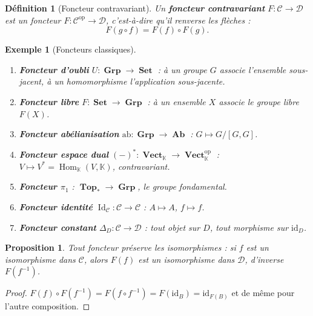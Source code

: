 \documentclass[a4paper,12pt]{book}
\DeclareMathOperator{\Hom}{Hom}
\DeclareMathOperator{\Id}{Id}
\DeclareMathOperator{\Set}{\mathbf{Set}}
\DeclareMathOperator{\Grp}{\mathbf{Grp}}
\DeclareMathOperator{\Ab}{\mathbf{Ab}}
\DeclareMathOperator{\Top}{\mathbf{Top}}
\DeclareMathOperator{\Vect}{\mathbf{Vect}}
\newcommand{\op}{\mathrm{op}}
\newcommand{\id}{\mathrm{id}}
\newcommand{\K}{\mathbb{K}}
\newtheorem{proposition}[theoreme]{Proposition}
\newtheorem{definition}[theoreme]{Définition}
\newtheorem{exemple}[theoreme]{Exemple}
\begin{document}
\begin{definition}[Foncteur contravariant]\label{def:foncteur-contra}
Un \textbf{foncteur contravariant} $F : \mathcal{C} \to \mathcal{D}$ est un foncteur $F : \mathcal{C}^{\op} \to \mathcal{D}$, c'est-à-dire qu'il \emph{renverse les flèches} :
\[
  F(g \circ f) = F(f) \circ F(g).
\]
\end{definition}

\begin{exemple}[Foncteurs classiques]\label{ex:foncteurs}
\begin{enumerate}[label=(\alph*)]
  \item \textbf{Foncteur d'oubli} $U : \Grp \to \Set$ : à un groupe $G$ associe l'ensemble sous-jacent, à un homomorphisme l'application sous-jacente.
  \item \textbf{Foncteur libre} $F : \Set \to \Grp$ : à un ensemble $X$ associe le groupe libre $F(X)$.
  \item \textbf{Foncteur abélianisation} $\mathrm{ab} : \Grp \to \Ab$ : $G \mapsto G/[G,G]$.
  \item \textbf{Foncteur espace dual} $(-)^* : \Vect_\K \to \Vect_\K^{\op}$ : $V \mapsto V^* = \Hom_\K(V, \K)$, contravariant.
  \item \textbf{Foncteur $\pi_1$} : $\Top_* \to \Grp$, le groupe fondamental.
  \item \textbf{Foncteur identité} $\Id_\mathcal{C} : \mathcal{C} \to \mathcal{C}$ : $A \mapsto A$, $f \mapsto f$.
  \item \textbf{Foncteur constant} $\Delta_D : \mathcal{C} \to \mathcal{D}$ : tout objet sur $D$, tout morphisme sur $\id_D$.
\end{enumerate}
\end{exemple}

\begin{proposition}\label{prop:foncteur-iso}
Tout foncteur préserve les isomorphismes : si $f$ est un isomorphisme dans $\mathcal{C}$, alors $F(f)$ est un isomorphisme dans $\mathcal{D}$, d'inverse $F(f^{-1})$.
\end{proposition}

\begin{proof}
$F(f) \circ F(f^{-1}) = F(f \circ f^{-1}) = F(\id_B) = \id_{F(B)}$ et de même pour l'autre composition.
\end{proof}
\end{document}
